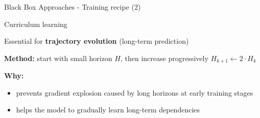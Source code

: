 \begin{frame}{Black Box Approaches - Training recipe (2)}

    \begin{block}{Curriculum learning}

        Essential for \textbf{trajectory evolution} (long-term prediction)
        
        \vspace{1em}
        \textbf{Method:} start with small horizon $H$, then increase progressively
        $ H_{k+1} \leftarrow 2 \cdot H_k $
        
        \vspace{0.5em}
        \textbf{Why:} 
        \begin{itemize}
            \item prevents \alert{gradient explosion} caused by long horizons at early training stages
            \item helps the model to gradually learn long-term dependencies
        \end{itemize}
    \end{block}
    
\end{frame}

